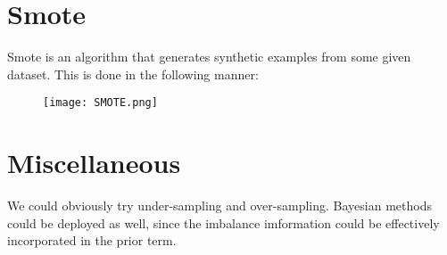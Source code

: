 \documentclass{article}
\begin{document}
\section{Smote}
Smote is an algorithm that generates synthetic examples from some given dataset. This is done in the following manner:
\begin{figure}
\centering
\texttt{[image: SMOTE.png]}
\end{figure}
\section{Miscellaneous}
We could obviously try under-sampling and over-sampling. Bayesian methods could be deployed as well, since the imbalance imformation could be effectively incorporated in the prior term.  
\end{document}
